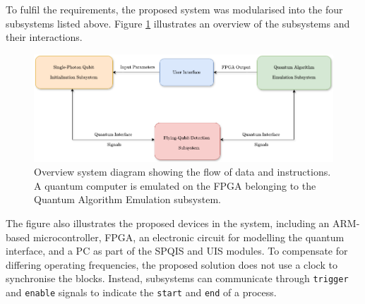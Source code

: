 To fulfil the requirements, the proposed system was modularised into the four subsystems listed above. Figure \ref{fig:overall-system-architecture} illustrates an overview of the subsystems and their interactions.
\begin{figure}[!ht]
	\centering
	\includegraphics[width=\linewidth]{body/ch4/figs/overall-system-architecture}
	\caption[Subsystem Block Diagram.]{Overview system diagram showing the flow of data and instructions. A quantum computer is emulated on the FPGA belonging to the Quantum Algorithm Emulation subsystem.}
	\label{fig:overall-system-architecture}
\end{figure}

The figure also illustrates the proposed devices in the system, including an ARM-based microcontroller, FPGA, an electronic circuit for modelling the quantum interface, and a PC as part of the SPQIS and UIS modules. To compensate for differing operating frequencies, the proposed solution does not use a clock to synchronise the blocks. Instead, subsystems can communicate through \texttt{trigger} and \texttt{enable} signals to indicate the \texttt{start} and \texttt{end} of a process.

